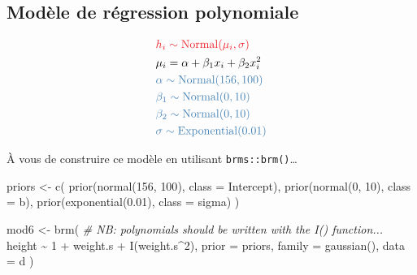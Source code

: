 \documentclass[
  a4paper,11pt,twoside,onecolumn,openright,final,oldfontcommands]{memoir}
\newenvironment{Shaded}{\begin{snugshade}}{\end{snugshade}}
\newcommand{\AttributeTok}[1]{\textcolor[rgb]{0.77,0.63,0.00}{#1}}
\newcommand{\CommentTok}[1]{\textcolor[rgb]{0.56,0.35,0.01}{\textit{#1}}}
\newcommand{\DecValTok}[1]{\textcolor[rgb]{0.00,0.00,0.81}{#1}}
\newcommand{\FloatTok}[1]{\textcolor[rgb]{0.00,0.00,0.81}{#1}}
\newcommand{\FunctionTok}[1]{\textcolor[rgb]{0.00,0.00,0.00}{#1}}
\newcommand{\NormalTok}[1]{#1}
\newcommand{\OtherTok}[1]{\textcolor[rgb]{0.56,0.35,0.01}{#1}}
\newcommand{\SpecialCharTok}[1]{\textcolor[rgb]{0.00,0.00,0.00}{#1}}
\theoremstyle{definition}
\theoremstyle{definition}
\theoremstyle{definition}
\theoremstyle{remark}
\begin{document}
\hypertarget{moduxe8le-de-ruxe9gression-polynomiale}{%
\subsection{Modèle de régression polynomiale}\label{moduxe8le-de-ruxe9gression-polynomiale}}

\[
\begin{aligned}
&\color{orangered}{h_{i} \sim \mathrm{Normal}(\mu_{i}, \sigma)} \\
&\mu_{i} = \alpha + \beta_{1} x_{i} + \beta_{2} x_{i}^{2} \\
&\color{steelblue}{\alpha \sim \mathrm{Normal}(156, 100)} \\
&\color{steelblue}{\beta_{1} \sim \mathrm{Normal}(0, 10)} \\
&\color{steelblue}{\beta_{2} \sim \mathrm{Normal}(0, 10)} \\
&\color{steelblue}{\sigma \sim \mathrm{Exponential}(0.01)} \\
\end{aligned}
\]

À vous de construire ce modèle en utilisant \texttt{brms::brm()}\ldots{}

\begin{Shaded}
\begin{Highlighting}[]
\NormalTok{priors }\OtherTok{\textless{}{-}} \FunctionTok{c}\NormalTok{(}
  \FunctionTok{prior}\NormalTok{(}\FunctionTok{normal}\NormalTok{(}\DecValTok{156}\NormalTok{, }\DecValTok{100}\NormalTok{), }\AttributeTok{class =}\NormalTok{ Intercept),}
  \FunctionTok{prior}\NormalTok{(}\FunctionTok{normal}\NormalTok{(}\DecValTok{0}\NormalTok{, }\DecValTok{10}\NormalTok{), }\AttributeTok{class =}\NormalTok{ b),}
  \FunctionTok{prior}\NormalTok{(}\FunctionTok{exponential}\NormalTok{(}\FloatTok{0.01}\NormalTok{), }\AttributeTok{class =}\NormalTok{ sigma)}
\NormalTok{  )}

\NormalTok{mod6 }\OtherTok{\textless{}{-}} \FunctionTok{brm}\NormalTok{(}
  \CommentTok{\# NB: polynomials should be written with the I() function...}
\NormalTok{  height }\SpecialCharTok{\textasciitilde{}} \DecValTok{1} \SpecialCharTok{+}\NormalTok{ weight.s }\SpecialCharTok{+} \FunctionTok{I}\NormalTok{(weight.s}\SpecialCharTok{\^{}}\DecValTok{2}\NormalTok{),}
  \AttributeTok{prior =}\NormalTok{ priors,}
  \AttributeTok{family =} \FunctionTok{gaussian}\NormalTok{(),}
  \AttributeTok{data =}\NormalTok{ d}
\NormalTok{  )}
\end{Highlighting}
\end{Shaded}
\end{document}
